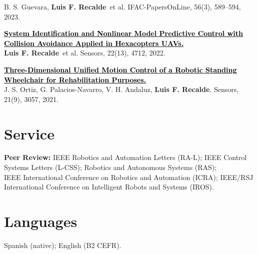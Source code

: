 \documentclass[letterpaper,11pt]{article}
\newcommand{\authorname}{\textcolor{AuthorTeal}{\textbf{Luis F. Recalde}}}
\newcommand{\journal}[1]{\textcolor{HeadingNavy}{#1}}
\newcommand{\papertitle}[1]{\textcolor{black}{\textbf{#1}}}
\begin{document}
\begin{enumerate}[leftmargin=0.28in, label={[\arabic*]}, itemsep=2pt, parsep=0pt, topsep=3pt]
B. S. Guevara, \authorname\ et al. \journal{IFAC-PapersOnLine}, 56(3), 589--594, 2023.
\item \href{https://doi.org/10.3390/s22134712}{\papertitle{System Identification and Nonlinear Model Predictive Control with Collision Avoidance Applied in Hexacopters UAVs.}}\\
\authorname\ et al. \journal{Sensors}, 22(13), 4712, 2022.
\item \href{https://doi.org/10.3390/s21093057}{\papertitle{Three-Dimensional Unified Motion Control of a Robotic Standing Wheelchair for Rehabilitation Purposes.}}\\
J. S. Ortiz, G. Palacios-Navarro, V. H. Andaluz, \authorname. \journal{Sensors}, 21(9), 3057, 2021.
\end{enumerate}
\section{Service}
{\small
\textbf{Peer Review:} IEEE Robotics and Automation Letters (RA-L); IEEE Control Systems Letters (L-CSS); Robotics and Autonomous Systems (RAS);\\
IEEE International Conference on Robotics and Automation (ICRA); IEEE/RSJ International Conference on Intelligent Robots and Systems (IROS).\par}
\section{Languages}
{\small Spanish (native); English (B2 CEFR).\par}
\end{document}
